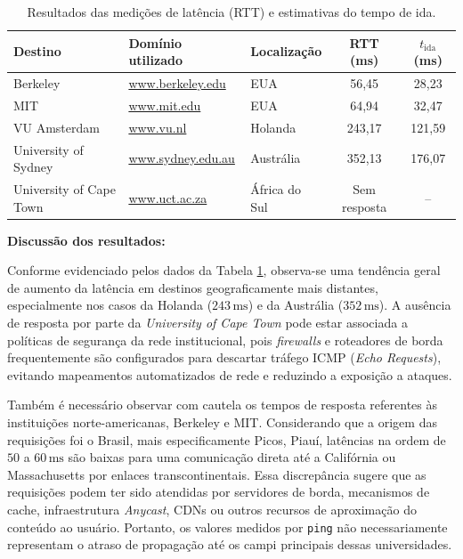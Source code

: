 \documentclass[12pt,a4paper]{report}
\begin{document}
\begin{table}[htpb]
    \centering
    \small
    \begin{tabular}{p{3.4cm}p{3.7cm}lcc}
        \toprule
        \textbf{Destino} & \textbf{Domínio utilizado} & \textbf{Localização} & \textbf{RTT (ms)} & \textbf{$t_{\text{ida}}$ (ms)} \\
        \midrule
        Berkeley & \url{www.berkeley.edu} & EUA & 56{,}45 & 28{,}23 \\
        MIT & \url{www.mit.edu} & EUA & 64{,}94 & 32{,}47 \\
        VU Amsterdam & \url{www.vu.nl} & Holanda & 243{,}17 & 121{,}59 \\
        University of Sydney & \url{www.sydney.edu.au} & Austrália & 352{,}13 & 176{,}07 \\
        University of Cape Town & \url{www.uct.ac.za} & África do Sul & Sem resposta & -- \\
        \bottomrule
    \end{tabular}
    \caption{Resultados das medições de latência (RTT) e estimativas do tempo de ida.}
    \label{tab:latencia_ping}
\end{table}

\textbf{Discussão dos resultados:}

Conforme evidenciado pelos dados da Tabela \ref{tab:latencia_ping}, observa-se uma tendência geral de aumento da latência em destinos geograficamente mais distantes, especialmente nos casos da Holanda ($243\,\text{ms}$) e da Austrália ($352\,\text{ms}$). A ausência de resposta por parte da \textit{University of Cape Town} pode estar associada a políticas de segurança da rede institucional, pois \textit{firewalls} e roteadores de borda frequentemente são configurados para descartar tráfego ICMP (\textit{Echo Requests}), evitando mapeamentos automatizados de rede e reduzindo a exposição a ataques.

Também é necessário observar com cautela os tempos de resposta referentes às instituições norte-americanas, Berkeley e MIT. Considerando que a origem das requisições foi o Brasil, mais especificamente Picos, Piauí, latências na ordem de $50$ a $60\,\text{ms}$ são baixas para uma comunicação direta até a Califórnia ou Massachusetts por enlaces transcontinentais. Essa discrepância sugere que as requisições podem ter sido atendidas por servidores de borda, mecanismos de cache, infraestrutura \textit{Anycast}, CDNs ou outros recursos de aproximação do conteúdo ao usuário. Portanto, os valores medidos por \texttt{ping} não necessariamente representam o atraso de propagação até os campi principais dessas universidades.
\vspace{0.6cm}
\end{document}
